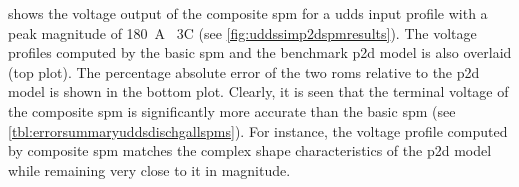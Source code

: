   shows  the  voltage  output  of  the
composite  \gls{spm}  for a  \gls{udds}  input  profile  with a  peak  magnitude
of   \SI{180}{\ampere}  \ie~3C  (see \cref{fig:uddssimp2dspmresults}).   The
voltage   profiles  computed   by  the   basic  \gls{spm}   and  the   benchmark
\gls{p2d}  model   is  also  overlaid   (top  plot).  The   percentage  absolute
error  of  the  two  \glspl{rom}  relative  to  the  \gls{p2d}  model  is  shown
in  the  bottom  plot.  Clearly,  it  is  seen  that  the  terminal  voltage  of
the  composite  \gls{spm}   is  significantly  more  accurate   than  the  basic
\gls{spm}  (see \cref{tbl:errorsummaryuddsdischgallspms}).   For  instance,  the
voltage  profile  computed by  composite  \gls{spm}  matches the  complex  shape
characteristics  of the  \gls{p2d} model  while remaining  very close  to it  in
magnitude.

